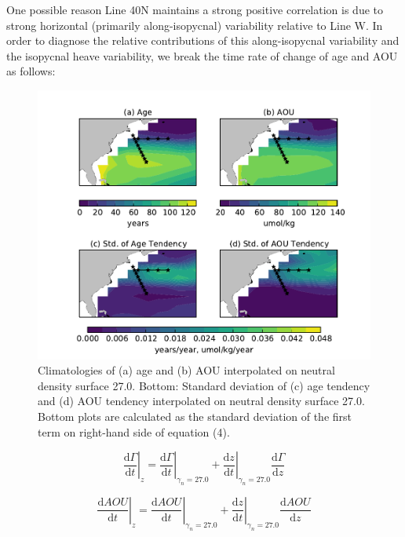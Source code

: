 One possible reason Line 40N maintains a strong positive correlation is due to
strong horizontal (primarily along-isopycnal) variability relative to Line W.
In order to diagnose the relative contributions of this along-isopycnal
variability and the isopycnal heave variability, we break the time rate of change
of age and AOU as follows:

\begin{figure}
\centering
\includegraphics[width=\linewidth]{spice_figure.pdf}
\caption{Climatologies of (a) age and (b) AOU interpolated on neutral density surface 27.0. Bottom: Standard deviation of (c) age tendency and (d) AOU tendency interpolated on neutral density surface 27.0. Bottom plots are calculated as the standard deviation of the first term on right-hand side of equation (4).}
\label{fig:spice}
\end{figure}

\begin{equation}
	\left. \frac{\mathrm{d}\Gamma}{\mathrm{d}t}\right|_z = \left. \frac{\mathrm{d}\Gamma}{\mathrm{d}t}\right|_{\gamma_n=27.0} + \left. \frac{\mathrm{d}z}{\mathrm{d}t}\right|_{\gamma_n=27.0} \frac{\mathrm{d}\Gamma}{\mathrm{d}z}
\end{equation}

\begin{equation}
 \left. \frac{\mathrm{d}AOU}{\mathrm{d}t}\right|_z = \left. \frac{\mathrm{d}AOU}{\mathrm{d}t}\right|_{\gamma_n=27.0} + \left. \frac{\mathrm{d}z}{\mathrm{d}t}\right|_{\gamma_n=27.0} \frac{\mathrm{d}AOU}{\mathrm{d}z}
\end{equation}


